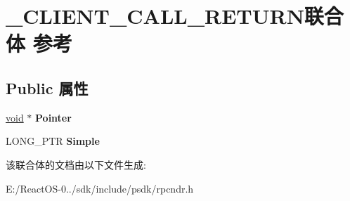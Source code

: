 \hypertarget{union___c_l_i_e_n_t___c_a_l_l___r_e_t_u_r_n}{}\section{\+\_\+\+C\+L\+I\+E\+N\+T\+\_\+\+C\+A\+L\+L\+\_\+\+R\+E\+T\+U\+R\+N联合体 参考}
\label{union___c_l_i_e_n_t___c_a_l_l___r_e_t_u_r_n}
\subsection*{Public 属性}
\begin{DoxyCompactItemize}
\item 
\mbox{\label{union___c_l_i_e_n_t___c_a_l_l___r_e_t_u_r_n_a10084907eb3ce91b7d861fcf43b244ec}} 
\hyperlink{interfacevoid}{void} $\ast$ {\bfseries Pointer}
\item 
\mbox{\label{union___c_l_i_e_n_t___c_a_l_l___r_e_t_u_r_n_a88deb29dc690523dfde8aa0772da1eac}} 
L\+O\+N\+G\+\_\+\+P\+TR {\bfseries Simple}
\end{DoxyCompactItemize}


该联合体的文档由以下文件生成\+:\begin{DoxyCompactItemize}
\item 
E\+:/\+React\+O\+S-\/0../sdk/include/psdk/rpcndr.\+h\end{DoxyCompactItemize}
